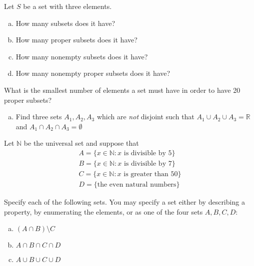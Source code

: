 

\begin{exercise}{}
Let $S$ be a set with three elements.
\begin{enumerate}[(a)]
\item
How many subsets does it have?
\item
How many proper subsets does it have?
\item
How many nonempty subsets does it have?
\item
How many nonempty proper subsets does it have?
\end{enumerate}
\end{exercise}

\begin{exercise}{7}
What is the smallest number of elements a set must have in order to have 20 proper subsets?
\end{exercise}

\begin{exercise}{12}
\begin{enumerate}[(a)]
\item
Find three sets $A_1, A_2, A_3$ which are \emph{not} disjoint such that $A_{1} \cup A_2 \cup A_3 = {\mathbb R}$ and $A_{1} \cap A_2 \cap A_3 = \emptyset$
\end{enumerate}
\end{exercise}

\begin{exercise}{20}
Let ${\mathbb N}$ be the universal set and suppose that
\begin{align*}
A = \{ x \in {\mathbb N} : x \text{ is divisible by 5}\} \\ 
B = \{ x \in {\mathbb N} : x \text{ is divisible by 7}\} \\ 
C = \{ x \in {\mathbb N} : x \text{ is greater than 50}\} \\
D = \{\text{the even natural numbers}\}
\end{align*} 

\noindent
Specify each of the following sets. You may specify a set either by describing a property, by enumerating the elements, or as one of the four sets $A, B, C, D$:
\begin{enumerate}[(a)]
\item
$(A \cap B) \setminus C$
\item
$A \cap B \cap C \cap D$
\item
$A \cup B \cup C \cup D$

\end{enumerate}
\end{exercise}

